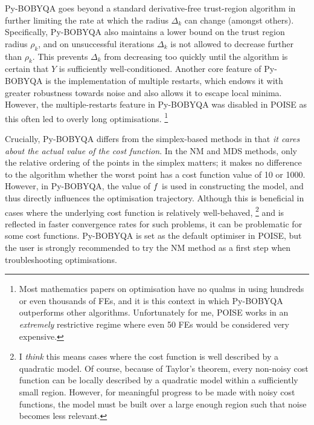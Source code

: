 Py-BOBYQA goes beyond a standard derivative-free trust-region algorithm in further limiting the rate at which the radius $\Delta_k$ can change (amongst others).
Specifically, Py-BOBYQA also maintains a lower bound on the trust region radius $\rho_k$, and on unsuccessful iterations $\Delta_k$ is not allowed to decrease further than $\rho_k$.
This prevents $\Delta_k$ from decreasing too quickly until the algorithm is certain that $Y$ is sufficiently well-conditioned.\autocite{Powell2003MP}
Another core feature of Py-BOBYQA is the implementation of multiple restarts, which endows it with greater robustness towards noise and also allows it to escape local minima.\autocite{Cartis2019ACMTMS,Cartis2022O}
However, the multiple-restarts feature in Py-BOBYQA was disabled in POISE as this often led to overly long optimisations.%
\footnote{Most mathematics papers on optimisation have no qualms in using hundreds or even thousands of FEs, and it is this context in which Py-BOBYQA outperforms other algorithms. Unfortunately for me, POISE works in an \textit{extremely} restrictive regime where even 50 FEs would be considered very expensive.}

Crucially, Py-BOBYQA differs from the simplex-based methods in that \textit{it cares about the actual value of the cost function}.
In the NM and MDS methods, only the relative ordering of the points in the simplex matters; it makes no difference to the algorithm whether the worst point has a cost function value of 10 or 1000.
However, in Py-BOBYQA, the value of $f\/$ is used in constructing the model, and thus directly influences the optimisation trajectory.
Although this is beneficial in cases where the underlying cost function is relatively well-behaved,%
\footnote{I \textit{think} this means cases where the cost function is well described by a quadratic model. Of course, because of Taylor's theorem, every non-noisy cost function can be locally described by a quadratic model within a sufficiently small region. However, for meaningful progress to be made with noisy cost functions, the model must be built over a large enough region such that noise becomes less relevant.}
and is reflected in faster convergence rates for such problems, it can be problematic for some cost functions.
Py-BOBYQA is set as the default optimiser in POISE, but the user is strongly recommended to try the NM method as a first step when troubleshooting optimisations.
